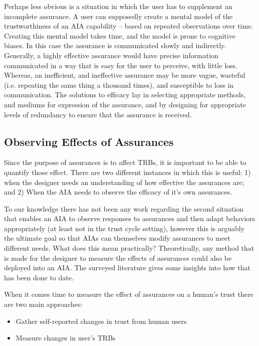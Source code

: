     Perhaps less obvious is a situation in which the user has to supplement an incomplete assurance. A user can supposedly create a mental model of the trustworthiness of an AIA capability -- based on repeated observations over time. Creating this mental model takes time, and the model is prone to cognitive biases. In this case the assurance is communicated slowly and indirectly. Generally, a highly effective assurance would have precise information communicated in a way that is easy for the user to perceive, with little loss. Whereas, an inefficient, and ineffective assurance may be more vague, wasteful (i.e. repeating the same thing a thousand times), and susceptible to loss in communication. The solutions to efficacy lay in selecting appropriate methods, and mediums for expression of the assurance, and by designing for appropriate levels of redundancy to ensure that the assurance is received.

\subsection{Observing Effects of Assurances} \label{sec:measuring_effects}

    Since the purpose of assurances is to affect TRBs, it is important to be able to quantify those effect. There are two different instances in which this is useful: 1) when the designer needs an understanding of how effective the assurances are; and 2) When the  AIA needs to observe the efficacy of it's own assurances.
    
    To our knowledge there has not been any work regarding the second situation that enables an AIA to observe responses to assurances and then adapt behaviors appropriately (at least not in the trust cycle setting), however this is arguably the ultimate goal so that AIAs can themselves modify assurances to meet different needs. What does this mean practically? Theoretically, any method that is made for the designer to measure the effects of assurances could also be deployed into an AIA. The surveyed literature gives some insights into how that has been done to date.
   
    When it comes time to measure the effect of assurances on a human's trust there are two main approaches:
    
    \begin{itemize}
        \item Gather self-reported changes in trust from human users
        \item Measure changes in user's TRBs
    \end{itemize}
    
